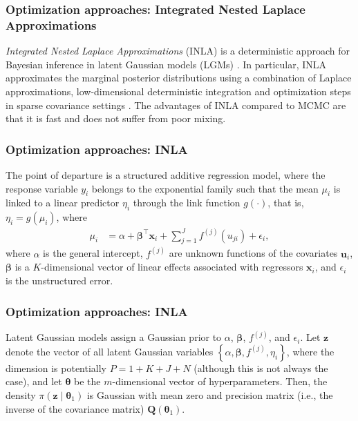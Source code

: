 \documentclass[12pt, compress]{beamer}
\begin{document}
\begin{frame}
	\frametitle{Optimization approaches: Integrated Nested Laplace Approximations}
\textit{Integrated Nested Laplace Approximations} (INLA) is a deterministic approach for Bayesian inference in latent Gaussian models (LGMs) \citep{rue2009approximate}. In particular, INLA approximates the marginal posterior distributions using a combination of Laplace approximations, low-dimensional deterministic integration and optimization steps in sparse covariance settings \citep{rue2017bayesian}. The advantages of INLA compared to MCMC are that it is fast and does not suffer from poor mixing.
\end{frame}

\begin{frame}
	\frametitle{Optimization approaches: INLA}
The point of departure is a structured additive regression model, where the response variable $y_i$ belongs to the exponential family such that the mean $\mu_i$ is linked to a linear predictor $\eta_i$ through the link function $g(\cdot)$, that is, $\eta_i=g(\mu_i)$, where
\begin{align*}
	\mu_i&=\alpha+\boldsymbol{\beta}^{\top}\boldsymbol{x}_{i}+\sum_{j=1}^{J}f^{(j)}(u_{ji})+\epsilon_{i},
\end{align*}
where $\alpha$ is the general intercept, $f^{(j)}$ are unknown functions of the covariates $\boldsymbol{u}_i$, $\boldsymbol{\beta}$ is a $K$-dimensional vector of linear effects associated with regressors $\boldsymbol{x}_i$, and $\epsilon_{i}$ is the unstructured error.
\end{frame}

\begin{frame}
	\frametitle{Optimization approaches: INLA}
Latent Gaussian models assign a Gaussian prior to $\alpha$, $\boldsymbol{\beta}$, $f^{(j)}$, and $\epsilon_{i}$. Let $\boldsymbol{z}$ denote the vector of all latent Gaussian variables $\left\{\alpha, \boldsymbol{\beta}, f^{(j)},\eta_{i}\right\}$, where the dimension is potentially \( P = 1 + K + J + N \) (although this is not always the case), and let $\boldsymbol{\theta}$ be the $m$-dimensional vector of hyperparameters. Then, the density $\pi(\boldsymbol{z} \mid \boldsymbol{\theta}_1)$ is Gaussian with mean zero and precision matrix (i.e., the inverse of the covariance matrix) $\boldsymbol{Q}(\boldsymbol{\theta}_1)$.
\end{frame}
\end{document}

